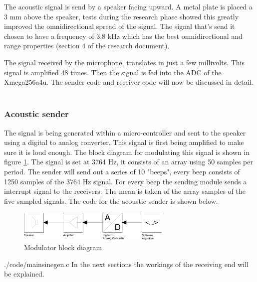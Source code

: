 \documentclass[10pt,a4paper]{article}
\begin{document}
The acoustic signal is send by a speaker facing upward. A metal plate is placed a 3 mm above the speaker, tests during the research phase showed this greatly improved the omnidirectional spread of the signal. The signal that's send it chosen to have a frequency of 3,8 kHz which has the best omnidirectional and range properties (section 4 of the research document).


The signal received by the microphone, translates in just a few millivolts. This signal is amplified 48 times. Then the signal is fed into the ADC of the Xmega256a4u. The sender code and receiver code will now be discussed in detail.\\\\

\subsubsection{Acoustic sender}
The signal is being generated within a micro-controller and sent to the speaker using a digital to analog converter. This signal is first being amplified to make sure it is loud enough. The block diagram for modulating this signal is shown in figure \ref{fig:modulatorblock}. The signal is set at 3764 Hz, it
consists of an array using 50 samples per period. The sender will send out a series of 10 "beeps", every beep consists of 1250 samples of the 3764 Hz signal. For every beep the sending  module sends a interrupt signal to the receivers. The mean is taken of the array samples of the five sampled signals. The code for the acoustic sender is shown below.

\begin{figure}[H]
    \centering
    \includegraphics[width=0.65\textwidth]{Modulator.pdf}
    \caption{Modulator block diagram}
    \label{fig:modulatorblock}
\end{figure}


{./code/mainsinegen.c}
In the next sections the workings of the receiving end will be explained.
\end{document}
